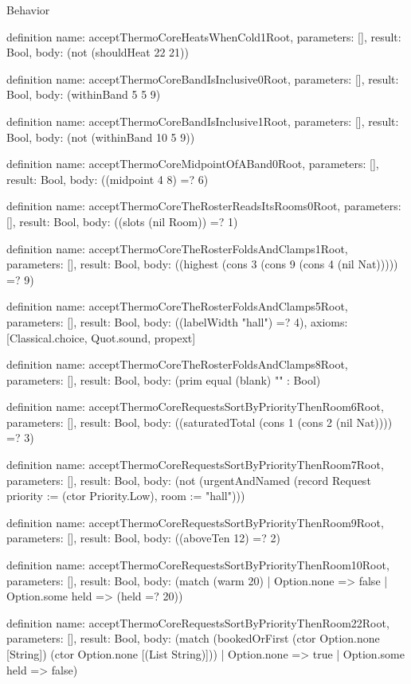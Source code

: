 \begin{lexlean}{Behavior}
\begin{semanticmodule}
definition{
  name: acceptThermoCoreHeatsWhenCold1Root,
  parameters: [],
  result: Bool,
  body: (not (shouldHeat 22 21))
}

definition{
  name: acceptThermoCoreBandIsInclusive0Root,
  parameters: [],
  result: Bool,
  body: (withinBand 5 5 9)
}

definition{
  name: acceptThermoCoreBandIsInclusive1Root,
  parameters: [],
  result: Bool,
  body: (not (withinBand 10 5 9))
}

definition{
  name: acceptThermoCoreMidpointOfABand0Root,
  parameters: [],
  result: Bool,
  body: ((midpoint 4 8) =? 6)
}

definition{
  name: acceptThermoCoreTheRosterReadsItsRooms0Root,
  parameters: [],
  result: Bool,
  body: ((slots (nil Room)) =? 1)
}

definition{
  name: acceptThermoCoreTheRosterFoldsAndClamps1Root,
  parameters: [],
  result: Bool,
  body: ((highest (cons 3 (cons 9 (cons 4 (nil Nat))))) =? 9)
}

definition{
  name: acceptThermoCoreTheRosterFoldsAndClamps5Root,
  parameters: [],
  result: Bool,
  body: ((labelWidth "hall") =? 4),
  axioms: [Classical.choice, Quot.sound, propext]
}

definition{
  name: acceptThermoCoreTheRosterFoldsAndClamps8Root,
  parameters: [],
  result: Bool,
  body: (prim equal (blank) "" : Bool)
}

definition{
  name: acceptThermoCoreRequestsSortByPriorityThenRoom6Root,
  parameters: [],
  result: Bool,
  body: ((saturatedTotal (cons 1 (cons 2 (nil Nat)))) =? 3)
}

definition{
  name: acceptThermoCoreRequestsSortByPriorityThenRoom7Root,
  parameters: [],
  result: Bool,
  body: (not (urgentAndNamed (record Request {priority := (ctor Priority.Low), room := "hall"})))
}

definition{
  name: acceptThermoCoreRequestsSortByPriorityThenRoom9Root,
  parameters: [],
  result: Bool,
  body: ((aboveTen 12) =? 2)
}

definition{
  name: acceptThermoCoreRequestsSortByPriorityThenRoom10Root,
  parameters: [],
  result: Bool,
  body: (match (warm 20) | Option.none => false | Option.some held => (held =? 20))
}

definition{
  name: acceptThermoCoreRequestsSortByPriorityThenRoom22Root,
  parameters: [],
  result: Bool,
  body: (match (bookedOrFirst (ctor Option.none [String]) (ctor Option.none [(List String)]))
    | Option.none => true
    | Option.some held => false)
}


\end{semanticmodule}
\end{lexlean}
